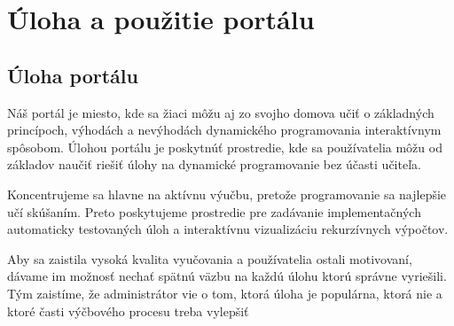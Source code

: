 \chapter{Úloha a použitie portálu}
\label{kap:overview}
\section{Úloha portálu}
Náš portál je miesto, kde sa žiaci môžu aj zo svojho domova učiť o základných princípoch,
výhodách a nevýhodách dynamického programovania interaktívnym spôsobom.
Úlohou portálu je poskytnúť prostredie, kde sa používatelia môžu od základov naučiť
riešiť úlohy na dynamické programovanie bez účasti učiteľa.

Koncentrujeme sa hlavne na aktívnu výučbu, pretože programovanie sa najlepšie učí
skúšaním. Preto poskytujeme prostredie pre zadávanie implementačných automaticky
testovaných úloh a interaktívnu vizualizáciu rekurzívnych výpočtov.

Aby sa zaistila vysoká kvalita vyučovania a používatelia ostali motivovaní, dávame
im možnosť nechať spätnú väzbu na každú úlohu ktorú správne vyriešili. Tým zaistíme,
že administrátor vie o tom, ktorá úloha je populárna, ktorá nie a ktoré časti výčbového
procesu treba vylepšiť

